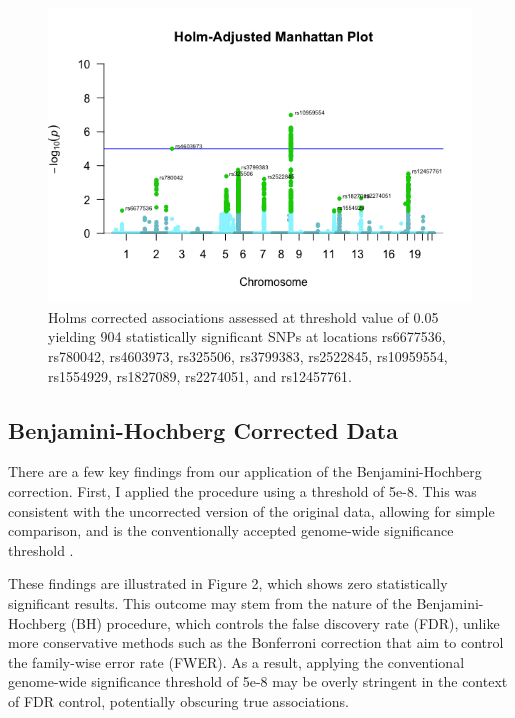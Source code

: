 \documentclass[12pt]{article}
\begin{document}
\begin{figure}
    \centering
    \includegraphics[width=1\linewidth]{Thesis_HolmCorrectedManhattanPlot.png}
    \caption{Holms corrected associations assessed at threshold value of 0.05 yielding 904 statistically significant SNPs at locations rs6677536, rs780042, rs4603973, rs325506, rs3799383, rs2522845, rs10959554, rs1554929, rs1827089, rs2274051, and rs12457761.}
    \label{fig:enter-label}
\end{figure}
\clearpage


\subsection{Benjamini-Hochberg Corrected Data}
There are a few key findings from our application of the Benjamini-Hochberg correction. First, I applied the procedure using a threshold of 5e-8. This was consistent with the uncorrected version of the original data, allowing for simple comparison, and is the conventionally accepted genome-wide significance threshold \cite{Chen2021}. \par

These findings are illustrated in Figure 2, which shows zero statistically significant results. This outcome may stem from the nature of the Benjamini-Hochberg (BH) procedure, which controls the false discovery rate (FDR), unlike more conservative methods such as the Bonferroni correction that aim to control the family-wise error rate (FWER). As a result, applying the conventional genome-wide significance threshold of 5e-8 may be overly stringent in the context of FDR control, potentially obscuring true associations. \par
\end{document}
